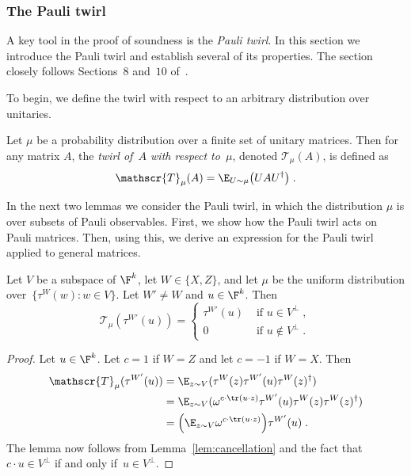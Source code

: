 \subsubsection{The Pauli twirl}

A key tool in the proof of soundness is the \emph{Pauli twirl}.
In this section we introduce the Pauli twirl and establish several of its
properties.
The section closely follows Sections~$8$ and~$10$ of~\cite{NW19}. 

To begin, we define the twirl with respect to an arbitrary distribution over
unitaries.

\begin{definition}[Twirl]
  \label{def:mixing}
  Let $\mu$ be a probability distribution over a finite set of unitary matrices.
  Then for any matrix $A$, the \emph{twirl of~$A$ with respect to~$\mu$},
  denoted $\mathscr{T}_\mu(A)$, is defined as
  \begin{equation*}
    \mathscr{T}_\mu (A) = \E_{U \sim \mu} \bigl( U A U^\dagger \bigr)\;.
  \end{equation*}
\end{definition}

In the next two lemmas we consider the Pauli twirl, in which the distribution
$\mu$ is over subsets of Pauli observables.
First, we show how the Pauli twirl acts on Pauli matrices.
Then, using this, we derive an expression for the Pauli twirl applied to general
matrices.

\begin{lemma}
  \label{lem:twirl-pauli}
  Let $V$ be a subspace of $\F^k$, let $W \in \{X, Z\}$, and let $\mu$ be the
  uniform distribution over~$\{\tau^W(w) : w \in V\}$.
  Let $W'\neq W$ and $u\in \F^k$.
  Then
  \begin{equation*}
    \mathscr{T}_\mu(\tau^{W'}(u)) =
    \begin{cases}
      \tau^{W'}(u)&\text{ if }u \in V^{\perp}\;,\\
      0 &\text{ if }u \notin V^{\perp}\;.
    \end{cases}
  \end{equation*}
\end{lemma}

\begin{proof}
  Let $u\in \F^k$.
  Let $c = 1$ if $W = Z$ and let $c = -1$ if $W = X$.
  Then
  \begin{align*}
    \mathscr{T}_\mu(\tau^{W'}(u))
    &= \E_{z \sim V} (\tau^W(z)  \tau^{W'}(u) \tau^W(z)^\dagger)\\
    &= \E_{z \sim V} (\omega^{c\cdot \tr(u \cdot z)} \tau^{W'}(u) \tau^W(z)
      \tau^W(z)^\dagger)\\
    &= \Big(\E_{z \sim V} \omega^{c\cdot \tr(u \cdot z)}\Big) \tau^{W'}(u)\;.
  \end{align*}
  The lemma now follows from Lemma~\ref{lem:cancellation}
  and the fact that $c \cdot u \in V^\perp$ if and only if~$u\in V^\perp$.
\end{proof}

